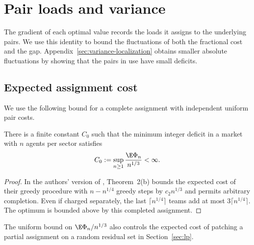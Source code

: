 \section{Pair loads and variance}\label{sec:variance}

The gradient of each optimal value records the loads it assigns to the underlying
pairs. We use this identity to bound the fluctuations of both the fractional cost
and the gap. Appendix~\ref{sec:variance-localization} obtains smaller absolute
fluctuations by showing that the pairs in use have small deficits.

\subsection{Expected assignment cost}\label{sec:variance-statement}

We use the following bound for a complete assignment with independent uniform pair costs.

\begin{proposition}\label{prop:variance-fpt}
There is a finite constant $C_0$ such that the minimum integer deficit in a market with
$n$ agents per sector satisfies
\begin{equation}\label{eq:variance-C0}
C_0:=\sup_{n\ge1}\frac{\E\Phi_n}{n^{1/3}}<\infty .
\end{equation}
\end{proposition}

\begin{proof}
In the authors' version of \cite{FPT20}, Theorem~2(b) bounds the expected cost of their
greedy procedure with $n-n^{1/4}$ greedy steps by $c_2 n^{1/3}$ and permits arbitrary
completion. Even if charged separately, the last $\lceil n^{1/4}\rceil$ teams add at
most $3\lceil n^{1/4}\rceil$. The optimum is bounded above by this completed assignment.
\end{proof}

\begin{remark}\label{rem:variance-fpt}
The uniform bound on $\E\Phi_n/n^{1/3}$ also controls the expected cost of patching a
partial assignment on a random residual set in Section~\ref{sec:lp}.
\end{remark}

